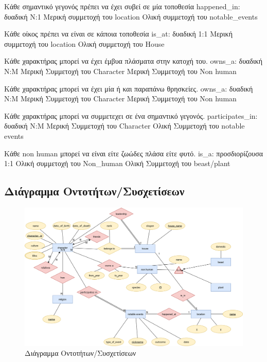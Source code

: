 \documentclass[../main.tex]{subfiles}
\begin{document}
{Κάθε σημαντικό γεγονός πρέπει να έχει συβεί σε μία τοποθεσία}
{happened_in: δυαδική}
{Ν:1}
{Μερική συμμετοχή του location \newline Ολική συμμετοχή του notable\_events}
{}

{Κάθε οίκος πρέπει να είναι σε κάποια τοποθεσία}
{is\_at: δυαδική}
{1:1}
{Μερική συμμετοχή του location \newline Ολική συμμετοχή του House}
{}

{Κάθε χαρακτήρας μπορεί να έχει έμβυα πλάσματα στην κατοχή του. }
{owns\_a: δυαδική}
{N:M}
{Μερική Συμμετοχή του Character \newline Μερική Συμμετοχή του Non human}
{}

{Κάθε χαρακτήρας μπορεί να έχει μία ή και παραπάνω θρησκείες.}
{owns\_a: δυαδική}
{N:M}
{Μερική Συμμετοχή του Character \newline Μερική Συμμετοχή του Non human}
{}

{Κάθε χαρακτήρας μπορεί να συμμετεχει σε ένα σημαντικό γεγονός.}
{participates\_in: δυαδική}
{N:M}
{Μερική Συμμετοχή του Character \newline Ολική Συμμετοχή του notable events}
{}

{Κάθε non human μπορεί να είναι είτε ζωώδες πλάσα είτε φυτό.}
{is\_a: προσδιορίζουσα }
{1:1}
{Ολική συμμετοχή του Non\_human \newline Ολική Συμμετοχή του beast/plant }
{}









\subsection{Διάγραμμα Οντοτήτων/Συσχετίσεων}

\begin{figure}[H]
	\includegraphics[width=\textwidth]{../images/entity_relation_diagram.png}
	\caption{Διάγραμμα Οντοτήτων/Συσχετίσεων}
\end{figure}
\end{document}
